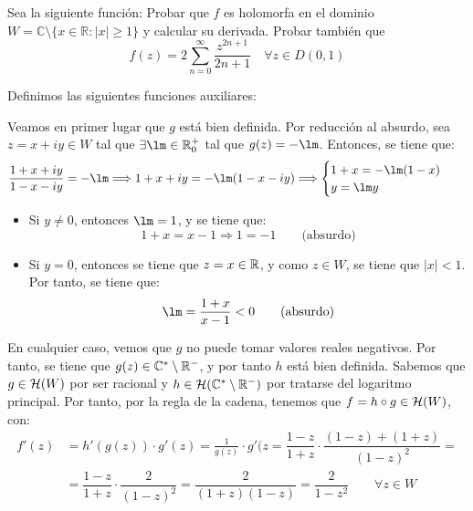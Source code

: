 \begin{ejercicio}
    Sea la siguiente función:
    Probar que $f$ es holomorfa en el dominio $W = \mathbb{C} \setminus \{x \in \mathbb{R} : |x| \geq 1\}$ y calcular su derivada. Probar también que
    \[
        f(z) = 2\sum_{n=0}^\infty \frac{z^{2n+1}}{2n+1} \quad \forall z \in D(0,1)
    \]

    Definimos las siguientes funciones auxiliares:

    Veamos en primer lugar que $g$ está bien definida. Por reducción al absurdo, sea $z=x+iy\in W$ tal que $\exists \lm\in \bb{R}^+_0$ tal que $g(z)=-\lm$. Entonces, se tiene que:
    \begin{align*}
        \dfrac{1+x+iy}{1-x-iy} &= -\lm \Longrightarrow 1+x+iy = -\lm(1-x-iy)
        \Longrightarrow \begin{cases}
            1+x = -\lm(1-x) \\
            y = \lm y
        \end{cases}
    \end{align*}
    \begin{itemize}
        \item Si $y\neq 0$, entonces $\lm = 1$, y se tiene que:
        \begin{equation*}
            1+x = x-1 \Longrightarrow 1 = -1\qquad \text{(absurdo)}
        \end{equation*}

        \item Si $y=0$, entonces se tiene que $z=x\in \mathbb{R}$, y como $z\in W$, se tiene que $|x|<1$. Por tanto, se tiene que:
        \begin{align*}
            \lm = \frac{1+x}{x-1}<0\qquad \text{(absurdo)}
        \end{align*}
    \end{itemize}

    En cualquier caso, vemos que $g$ no puede tomar valores reales negativos. Por tanto, se tiene que $g(z)\in \mathbb{C}^*\setminus \mathbb{R}^-$, y por tanto $h$ está bien definida. Sabemos que $g\in \mathcal{H}(W)$ por ser racional y $h\in \mathcal{H}(\mathbb{C}^*\setminus \mathbb{R}^-)$ por tratarse del logaritmo principal. Por tanto, por la regla de la cadena, tenemos que $f=h\circ g\in \mathcal{H}(W)$, con:
    \begin{align*}
        f'(z) &= h'(g(z))\cdot g'(z) = \frac{1}{g(z)}\cdot g'(z
        = \dfrac{1-z}{1+z}\cdot \dfrac{(1-z)+(1+z)}{(1-z)^2}
        =\\&=\dfrac{1-z}{1+z}\cdot \dfrac{2}{(1-z)^2}
        = \dfrac{2}{(1+z)(1-z)}
        = \dfrac{2}{1-z^2}\qquad \forall z\in W
    \end{align*}


\end{ejercicio}

